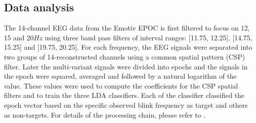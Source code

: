 \documentclass{svmult}
\begin{document}
\subsection{Data analysis}
The 14-channel EEG data from the Emotiv EPOC is first filtered to focus on 12, 15 and 20$Hz$ using three band pass filters of interval ranges: [11.75, 12.25], [14.75, 15.25] and [19.75, 20.25]. For each frequency, the EEG signals were separated into two groups of 14-reconstructed channels using a common spatial pattern (CSP) filter. Later the multi-variant signals were divided into epochs and the signals in the epoch were squared, averaged and followed by a natural logarithm of the value. These values were used to compute the coefficients for the CSP spatial filters and to train the three LDA classifiers. Each of the classifier classified the epoch vector based on the specific observed blink frequency as target and others as non-targets. For details of the processing chain, please refer to \cite{openvibeSSVEP}. 
\end{document}
